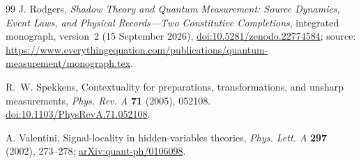 \documentclass[11pt,a4paper]{article}
\theoremstyle{definition}
\theoremstyle{remark}\newtheorem{remark}[theorem]{Remark}
\begin{document}
\begin{thebibliography}{99}
 J. Rodgers, \emph{Shadow Theory and Quantum Measurement: Source Dynamics, Event Laws, and Physical Records---Two Constitutive Completions}, integrated monograph, version~2 (15 September 2026), \href{https://doi.org/10.5281/zenodo.22774584}{doi:10.5281/zenodo.22774584}; source: \url{https://www.everythingequation.com/publications/quantum-measurement/monograph.tex}.

 R.~W. Spekkens, Contextuality for preparations, transformations, and unsharp measurements, \emph{Phys. Rev. A} \textbf{71} (2005), 052108. \href{https://doi.org/10.1103/PhysRevA.71.052108}{doi:10.1103/PhysRevA.71.052108}.

 A. Valentini, Signal-locality in hidden-variables theories, \emph{Phys. Lett. A} \textbf{297} (2002), 273--278; \href{https://arxiv.org/abs/quant-ph/0106098}{arXiv:quant-ph/0106098}.


\end{thebibliography}
\end{document}
